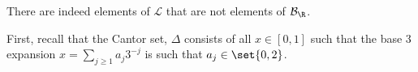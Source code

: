 \documentclass[10pt]{mypackage}
\begin{document}
%
%
There are indeed elements of $\mathcal{L}$ that are not elements of $\mathcal{B}_{\R}$.\newline

First, recall that the Cantor set, $\Delta$ consists of all $x\in [0,1]$ such that the base 3 expansion $x = \sum_{j\geq 1}a_j3^{-j}$ is such that $a_j \in \set{0,2}$.\newline
\end{document}
